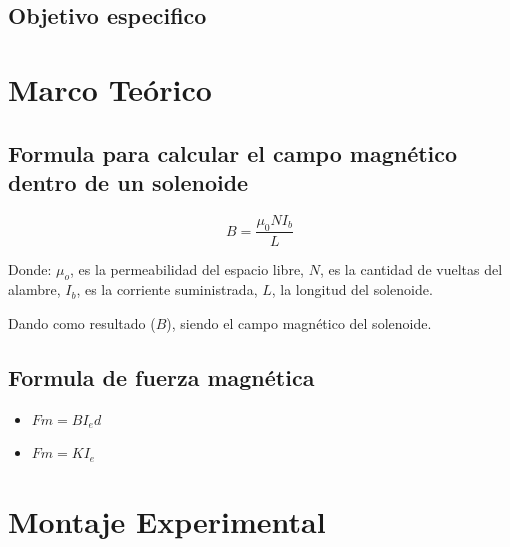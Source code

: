 \documentclass[twocolumn, 12pt]{article}
\begin{document}
\subsection{Objetivo especifico}


\section{Marco Teórico}

\subsection*{Formula para calcular el campo magnético dentro de un solenoide}

\begin{equation}
	B = {\frac{\mu_0 N I_b}{L}} \label{eq:FormulaCampoMagneticoSolenoide}
\end{equation}

\nocite{SolenoideGarcia2016}

Donde: \hfill \break{} \textit{{\large $\mu_o$}}, es la permeabilidad del
espacio libre, \textit{{\large $N$}}, es la cantidad de vueltas del alambre,
\textit{{\large $I_b$}}, es la corriente suministrada, \textit{{\large $L$}},
la longitud del solenoide.

Dando como resultado (\textit{{\large $B$}}), siendo el campo magnético
del solenoide.

\subsection*{Formula de fuerza magnética}

\begin{itemize}[label=$\triangleright$]
	\item {\large $Fm = B I_e d$}
	\item {\large $Fm = K I_e$}
\end{itemize}

\section{Montaje Experimental}

\end{document}
